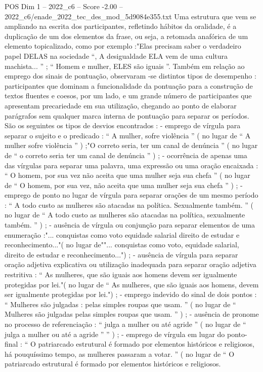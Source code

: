 \begin{textsample}{POS Dim 1 – 2022\_c6 – Score -2.00 – 2022\_c6/enade\_2022\_tec\_des\_mod\_5d9084e355.txt}
Uma estrutura que vem se ampliando na escrita dos participantes, refletindo hábitos da oralidade, é a duplicação de um dos elementos da frase, ou seja, a retomada anafórica de um elemento topicalizado, como por exemplo :"Elas precisam saber o verdadeiro papel DELAS na sociedade “, A desigualdade ELA vem de uma cultura machista... ” ; “ Homem e mulher, ELES são iguais ”.
Também em relação ao emprego dos sinais de pontuação, observaram -se distintos tipos de desempenho : participantes que dominam a funcionalidade da pontuação para a construção de textos fluentes e coesos, por um lado, e um grande número de participantes que apresentam precariedade em sua utilização, chegando ao ponto de elaborar parágrafos sem qualquer marca interna de pontuação para separar os períodos.
São os seguintes os tipos de desvios encontrados : - emprego de vírgula para separar o sujeito e o predicado : “ A mulher, sofre violência ” ( no lugar de “ A mulher sofre violência ” ) ;"O correto seria, ter um canal de denúncia ” ( no lugar de “ o correto seria ter um canal de denúncia ” ) ; - ocorrência de apenas uma das vírgulas para separar uma palavra, uma expressão ou uma oração encaixada : “ O homem, por sua vez não aceita que uma mulher seja sua chefa ” ( no lugar de “ O homem, por sua vez, não aceita que uma mulher seja sua chefa ” ) ; - emprego de ponto no lugar de vírgula para separar orações de um mesmo período : “ A todo custo as mulheres são atacadas na política.
Sexualmente também. ” ( no lugar de “ A todo custo as mulheres são atacadas na política, sexualmente também. ” ) ; - ausência de vírgula ou conjunção para separar elementos de uma enumeração :"... conquistas como voto equidade salarial direito de estudar e reconhecimento..."( no lugar de""... conquistas como voto, equidade salarial, direito de estudar e reconhecimento...") ; - ausência de vírgula para separar oração adjetiva explicativa ou utilização inadequada para separar oração adjetiva restritiva : “ As mulheres, que são iguais aos homens devem ser igualmente protegidas por lei."( no lugar de “ As mulheres, que são iguais aos homens, devem ser igualmente protegidas por lei.") ; - emprego indevido do sinal de dois pontos : “ Mulheres são julgadas : pelas simples roupas que usam. ” ( no lugar de “ Mulheres são julgadas pelas simples roupas que usam. ” ) ; - ausência de pronome no processo de referenciação : “ julga a mulher ou até agride ” ( no lugar de “ julga a mulher ou até a agride ” ” ) ; - emprego de vírgula em lugar do ponto-final : “ O patriarcado estrutural é formado por elementos históricos e religiosos, há pouquíssimo tempo, as mulheres passaram a votar. ” ( no lugar de “ O patriarcado estrutural é formado por elementos históricos e religiosos.

\end{textsample}
